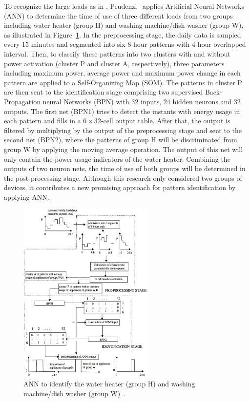 To recognize the large loads as in \cite{Farinaccio99EB}, Prudenzi~\cite{Prudenzi02} applies Artificial Neural Networks (ANN) to determine the time of use of three different loads from two groups including water heater (group H) and washing machine/dish washer (group W), as illustrated in Figure~\ref{fig:A10}. In the preprocessing stage, the daily data is sampled every 15 minutes and segmented into six 8-hour patterns with 4-hour overlapped interval. Then, to classify these patterns into two clusters with and without power activation (cluster P and cluster A, respectively), three parameters including maximum power, average power and maximum power change in each pattern are applied to a Self-Organizing Map (SOM). The patterns in cluster P are then sent to the identification stage comprising two supervised Back-Propagation neural Networks (BPN) with 32 inputs, 24 hidden neurons and 32 outputs. The first net (BPN1) tries to detect the instants with energy usage in each pattern and fills in a $6\times 32$-cell output table. After that, the output is filtered by multiplying by the output of the preprocessing stage and sent to the second net (BPN2), where the patterns of group H will be discriminated from group W by applying the moving average operation. The output of this net will only contain the power usage indicators of the water heater. Combining the outputs of two neuron nets, the time of use of both groups will be determined in the post-processing stage. Although this research only considered two groups of devices, it contributes a new promising approach for pattern identification by applying ANN.

\begin{figure}
\centering
\includegraphics[width=0.6\textwidth]{./chapters/chapter2/images/3-stage_ANN.pdf} 
\caption{ANN to identify the water heater (group H) and washing machine/dish washer (group W)~\cite{Prudenzi02}.} 
\label{fig:A10} 
\end{figure}

